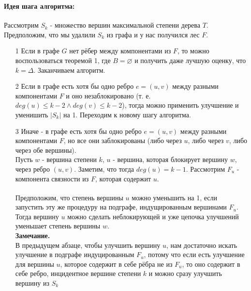 \documentclass[a4paper, 12pt]{article}
\begin{document}
\textbf{Идея шага алгоритма:}
\\
\\
Рассмотрим $S_k$ - множество вершин максимальной степени дерева $T$. Предположим, что мы удалили $S_k$ из графа и у нас получился лес $F$.

\begin{enumerate}

\item[1] Если в графе $G$ нет рёбер между компонентами из $F$, то можно воспользоваться теоремой 1, где $B = \varnothing$ и получить даже лучшую оценку, что $k = \Delta$. Заканчиваем алгоритм.
\item[2] Если в графе есть хотя бы одно ребро $e = (u, v)$ между разными компонентами $F$ и оно незаблокировано (т. е. $deg(u) \leqslant k - 2 \wedge deg(v) \leqslant k - 2$), тогда можно применить улучшение и уменишить $|S_k|$ на 1. Переходим к новому шагу алгоритма.
\item[3] Иначе - в графе есть хотя бы одно ребро $e = (u, v)$ между разными компонентами $F$, но все они заблокированы (либо через $u$, либо через $v$, либо через обе вершины).\\
Пусть $w$ - вершина степени $k$, $u$ - вершина, которая блокирует вершину $w$, через ребро $(u, v)$. Заметим, что тогда $deg(u) = k - 1$. Рассмотрим $F_u$ - компонента связности из $F$, которая содержит $u$.\\\\
Предположим, что степень вершины $u$ можно уменьшить на 1, если запустить эту же процедуру на подграфе, индущированным вершинами $F_u$. Тогда вершину $u$ можно сделать неблокирующей и уже цепочка улучшений уменьшает степень вершины $w$.\\

\textbf{Замечание.}\\
В предыдущем абзаце, чтобы улучшить вершину $u$, нам достаточно искать улучшение в подграфе индуцированным $F_u$, потому что если есть улучшение для вершины $u$, которое содержит в себе рёбра не из $F_u$, то оно содержит в себе ребро, инцидентное вершине степени $k$ и можно сразу улучшить вершину из $S_k$
\end{enumerate}
\end{document}
